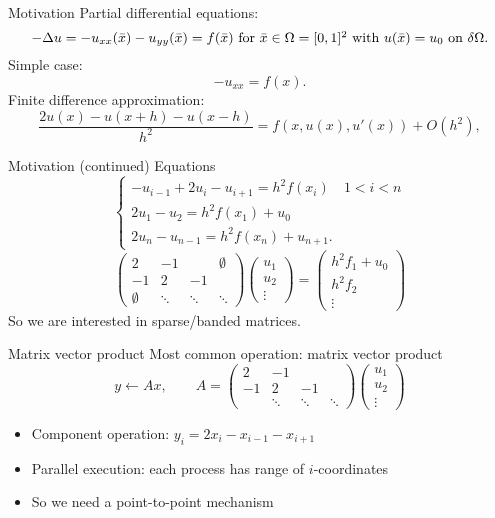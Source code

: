 \begin{optexerciseframe}
  
\end{optexerciseframe}


\begin{frame}{Motivation}
  Partial differential equations:
  \[
    \hbox{$-\Delta u = -u_{xx}(\bar x)-u_{yy}(\bar x)=f(\bar x)$ for
      $\bar x\in\Omega=[0,1]^2$ 
      with $u(\bar x)=u_0$ on $\delta\Omega$.}
    \]
  Simple case:
  \[ -u_{xx}=f(x). \]
  Finite difference approximation:
  \[ \frac{2u(x)-u(x+h)-u(x-h)}{h^2}=f(x,u(x),u'(x))+O(h^2), \]
\end{frame}

\begin{frame}{Motivation (continued)}
  Equations
  \[
  \begin{cases}
    -u_{i-1} + 2u_i - u_{i+1} = h^2f(x_i)&1<i<n \\
    2u_1-u_2=h^2f(x_1)+u_0\\
    2u_n-u_{n-1}=h^2f(x_{n})+u_{n+1}.
  \end{cases}
  \]
  \begin{equation}
    \begin{pmatrix}
      2&-1&&\emptyset\\ -1&2&-1\\ \emptyset&\ddots&\ddots&\ddots
    \end{pmatrix}
    \begin{pmatrix}
      u_1\\ u_2\\ \vdots
    \end{pmatrix}
    =
    \begin{pmatrix}
      h^2f_1+u_0\\ h^2f_2\\ \vdots
    \end{pmatrix}
    \label{eq:1d2nd-matrix-vector}
  \end{equation}
  So we are interested in sparse/banded matrices.
\end{frame}

\begin{frame}{Matrix vector product}
  Most common operation: matrix vector product
  \[ y\leftarrow Ax,\qquad
  A = \begin{pmatrix}
      2&-1\\ -1&2&-1\\ &\ddots&\ddots&\ddots
    \end{pmatrix}
    \begin{pmatrix}
      u_1\\ u_2\\ \vdots
    \end{pmatrix}
  \]
  \begin{itemize}
  \item Component operation: $y_i=2x_i-x_{i-1}-x_{i+1}$
  \item Parallel execution: each process has range of $i$-coordinates
  \item So we need a point-to-point mechanism
  \end{itemize}  
\end{frame}


